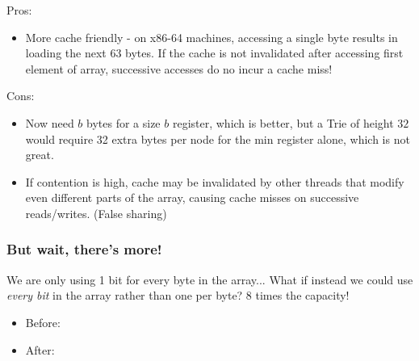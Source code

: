 \documentclass{beamer}
\begin{document}
\begin{frame}
Pros:
\begin{itemize}
	\item More cache friendly - on x86-64 machines, accessing a single byte results in loading the next 63 bytes.
	If the cache is not invalidated after accessing first element of array, successive accesses do no incur a cache miss!
\end{itemize}
Cons:
\begin{itemize}
	\item Now need $b$ bytes for a size $b$ register, which is better, but a Trie of height $32$ would require 32 extra bytes per node 
	for the min register alone, which is not great.
	\item If contention is high, cache may be invalidated by other threads that modify even different parts of the array, causing 
	cache misses on successive reads/writes. (False sharing)
\end{itemize}
\end{frame}
\begin{frame}[fragile]
\frametitle{But wait, there's more!}
We are only using 1 bit for every byte in the array...
What if instead we could use \emph{every bit} in the array rather than one per byte?
8 times the capacity!
\begin{itemize}
\item Before:
\\

\item After:
\\
\end{itemize}
\end{frame}
\end{document}
